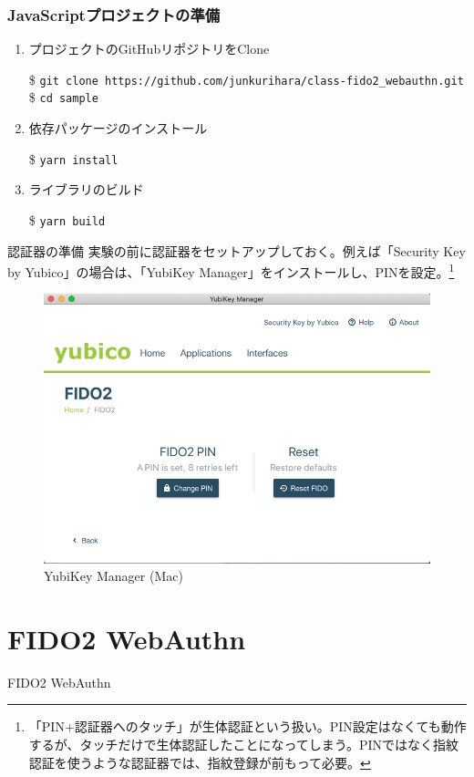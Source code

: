\documentclass[12pt,dvipdfmx,uplatex]{beamer}
\begin{document}
\begin{frame}
\frametitle{JavaScriptプロジェクトの準備}
\begin{enumerate}
\item \alert{プロジェクトのGitHubリポジトリをClone}\\
\begin{exampleblock}{}
\footnotesize
\$ \texttt{git clone https://github.com/junkurihara/class-fido2\_webauthn.git}\\
\$ \texttt{cd sample}
\end{exampleblock}
\item 依存パッケージのインストール
\begin{exampleblock}{}
\$ \texttt{yarn install}
\end{exampleblock}
\item ライブラリのビルド
\begin{exampleblock}{}
\$ \texttt{yarn build}
\end{exampleblock}
\end{enumerate}
\end{frame}

\begin{frame}{認証器の準備}
実験の前に認証器をセットアップしておく。例えば「Security Key by Yubico」の場合は、「YubiKey Manager」をインストールし、PINを設定。\footnote[frame]{\scriptsize 「PIN+認証器へのタッチ」が生体認証という扱い。PIN設定はなくても動作するが、タッチだけで生体認証したことになってしまう。PINではなく指紋認証を使うような認証器では、指紋登録が前もって必要。}
\begin{figure}
\begin{center}
\includegraphics[width=0.4\linewidth]{Figs/yubikey-manager.png}
\end{center}
\caption{YubiKey Manager (Mac)}
\end{figure}
\end{frame}


\section{FIDO2 WebAuthn}
\begin{frame}
\centering
{\huge FIDO2 WebAuthn}
\end{frame}
\end{document}
